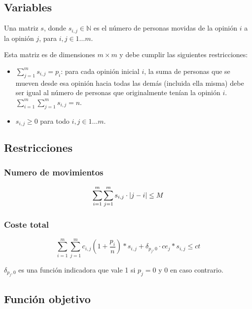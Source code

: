 \subsection{Variables}

Una matriz $s$, donde $s_{ i,j } \in \mathbb{ N }$ es el número de personas movidas de la opinión $i$ a la opinión $j$, para $i,j \in 1 \dots m$.

Esta matriz es de dimensiones $m \times m$ y debe cumplir las siguientes restricciones:

\begin{itemize}
	\item $\sum_{ j = 1 }^m s_{ i,j } = p_i$: para cada opinión inicial $i$, la suma de personas que se mueven desde esa opinión hacia todas las demás (incluida ella misma) debe ser igual al número de personas que originalmente tenían la opinión $i$. $\sum_{ i = 1 }^m \sum_{ j = 1 }^m s_{ i,j } = n$.

	\item $s_{ i,j } \geq 0$ para todo $i,j \in 1 \dots m$.
\end{itemize}

\subsection{Restricciones}

\subsubsection{Numero de movimientos}

\begin{equation}
	\sum_{ i = 1 }^m \sum_{ j = 1 }^m s_{ i,j } \cdot \left \lvert  j - i  \right \rvert \leq M
\end{equation}

\subsubsection{Coste total}

\begin{equation}
	\sum_{ i = 1 }^m \sum_{ j = 1 }^m c_{ i,j } \left (1 + \frac{ p_i }{ n } \right ) * s_{ i,j } + \delta_{ p_j, 0 } \cdot ce_j * s_{ i,j } \leq ct
\end{equation}

$\delta_{ p_j, 0 }$ es una función indicadora que vale 1 si $p_j = 0$ y 0 en caso contrario.

\subsection{Función objetivo}

